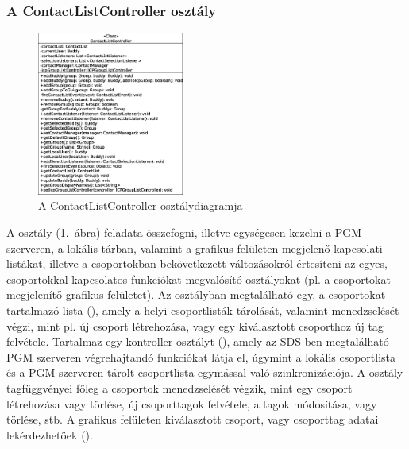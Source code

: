 \subsubsection*{A ContactListController osztály}
\label{sec:client_contactlistcontroller}

\begin{figure}
  \vspace{-15pt}
  \begin{center}
    \includegraphics[width=0.43\textwidth]{img/class_diagrams/client/eps/ContactListController.eps}
  \end{center}
  \vspace{-15pt}
  \captionsetup{font=scriptsize}
  \caption{A ContactListController osztálydiagramja}
   \label{fig:class_client_contactlistcontroller}
  \vspace{-10pt}
\end{figure}

A  osztály (\ref{fig:class_client_contactlistcontroller}.~ábra) feladata összefogni, illetve egységesen kezelni a PGM szerveren, a lokális tárban, valamint a grafikus felületen megjelenő kapcsolati listákat, illetve a csoportokban bekövetkezett változásokról értesíteni az egyes, csoportokkal kapcsolatos funkciókat megvalósító osztályokat (pl. a csoportokat megjelenítő grafikus felületet). Az osztályban megtalálható egy, a csoportokat tartalmazó lista (), amely a helyi csoportlisták tárolását, valamint menedzselését végzi, mint pl. új csoport létrehozása, vagy egy kiválasztott csoporthoz új tag felvétele. Tartalmaz egy kontroller osztályt (), amely az SDS-ben megtalálható PGM szerveren végrehajtandó funkciókat látja el, úgymint a lokális csoportlista és a PGM szerveren tárolt csoportlista egymással való szinkronizációja. A  osztály tagfüggvényei főleg a csoportok menedzselését végzik, mint egy csoport létrehozása vagy törlése, új csoporttagok felvétele, a tagok módosítása, vagy törlése, stb. A grafikus felületen kiválasztott csoport, vagy csoporttag adatai lekérdezhetőek ().

